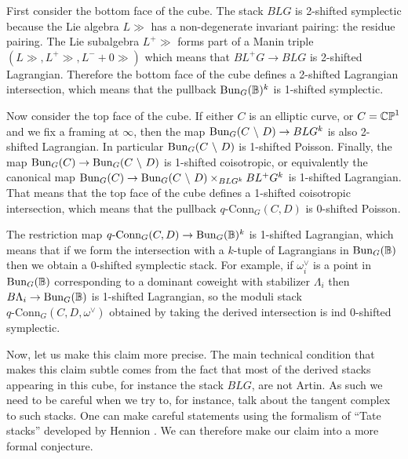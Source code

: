 \documentclass[10pt, oneside]{article}
\newcommand{\qconn}{q\text{-Conn}}
\begin{document}
\begin{claim}
First consider the bottom face of the cube.  The stack $BLG$ is 2-shifted symplectic because the Lie algebra $L\gg$ has a non-degenerate invariant pairing: the residue pairing.  The Lie subalgebra $L^+\gg$ forms part of a Manin triple $(L\gg, L^+\gg, L^-+0\gg)$ which means that $BL^+G \to BLG$ is 2-shifted Lagrangian.  Therefore the bottom face of the cube defines a 2-shifted Lagrangian intersection, which means that the pullback $\operatorname{Bun}_G(\mathbb{B})^k$ is 1-shifted symplectic.

Now consider the top face of the cube.  If either $C$ is an elliptic curve, or $C=\mathbb{CP}^1$ and we fix a framing at $\infty$, then the map $\operatorname{Bun}_G(C \ \backslash \  D) \to BLG^k$ is also 2-shifted Lagrangian.  In particular $\operatorname{Bun}_G(C \ \backslash \  D)$ is 1-shifted Poisson.  Finally, the map $\operatorname{Bun}_G(C) \to \operatorname{Bun}_G(C \ \backslash \  D)$ is 1-shifted coisotropic, or equivalently the canonical map $\operatorname{Bun}_G(C) \to \operatorname{Bun}_G(C \ \backslash \  D) \times_{BLG^k} BL^+G^k$ is 1-shifted Lagrangian.  That means that the top face of the cube defines a 1-shifted coisotropic intersection, which means that the pullback $\qconn_G(C,D)$ is 0-shifted Poisson.

The restriction map $\qconn_G(C,D) \to \bun_G(\bb B)^k$ is 1-shifted Lagrangian, which means that if we form the intersection with a $k$-tuple of Lagrangians in $\operatorname{Bun}_G(\mathbb{B})$ then we obtain a 0-shifted symplectic stack.  For example, if $\omega_i^\vee$ is a point in $\operatorname{Bun}_G(\mathbb{B})$ corresponding to a dominant coweight with stabilizer $\Lambda_i$ then $B \Lambda_i \to \operatorname{Bun}_G(\mathbb{B})$ is 1-shifted Lagrangian, so the moduli stack $\qconn_G(C,D, \omega^\vee)$ obtained by taking the derived intersection is ind 0-shifted symplectic.
\end{claim}

Now, let us make this claim more precise.  The main technical condition that makes this claim subtle comes from the fact that most of the derived stacks appearing in this cube, for instance the stack $BLG$, are not Artin.  As such we need to be careful when we try to, for instance, talk about the tangent complex to such stacks.  One can make careful statements using the formalism of ``Tate stacks'' developed by Hennion \cite{Hennion}.  We can therefore make our claim into a more formal conjecture.
\end{document}
